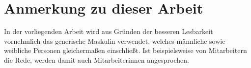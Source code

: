 \documentclass[
    ngerman          %
,a4paper          %
,12pt
,pdftex
]{report}
\begin{document}



    \onehalfspacing

    
    
    

    \newpage
    \tableofcontents           %

    

    \bigskip

    \section*{Anmerkung zu dieser Arbeit}
    In der vorliegenden Arbeit wird aus Gründen der besseren Lesbarkeit vornehmlich das generische Maskulin verwendet, welches männliche sowie weibliche Personen gleichermaßen einschließt. Ist beispielsweise von Mitarbeitern die Rede, werden damit auch Mitarbeiterinnen angesprochen.\\
    

    







    \def\refname{Literaturverzeichnis}
    \printbibliography


%

\end{document}
